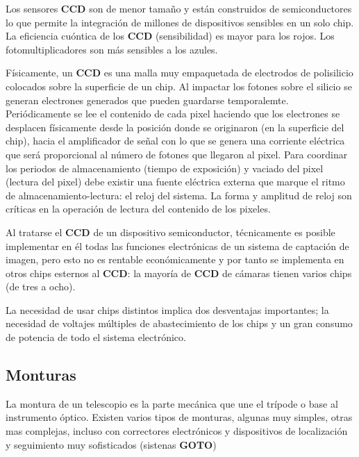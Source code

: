 \bigskip
Los sensores \textbf{CCD} son de menor tamaño y están construidos de semiconductores lo que permite la integración de millones de dispositivos sensibles en un solo chip.
La eficiencia cuóntica de los \textbf{CCD} (sensibilidad) es mayor para los rojos. Los fotomultiplicadores son más sensibles a los azules.

\bigskip
Físicamente, un \textbf{CCD} es una malla muy empaquetada de electrodos de polisilicio colocados sobre la superficie de un chip. Al impactar los fotones sobre el silicio se generan electrones generados que pueden guardarse temporalemte. Periódicamente se lee el contenido de cada pixel haciendo que los electrones se desplacen físicamente desde la posición donde se originaron (en la superficie del chip), hacia el amplificador de señal con lo que se genera una corriente eléctrica que será proporcional al número de fotones que llegaron al pixel. Para coordinar los periodos de almacenamiento (tiempo de exposición) y vaciado del pixel (lectura del pixel) debe existir una fuente eléctrica externa que marque el ritmo de almacenamiento-lectura: el reloj del sistema. La forma y amplitud de reloj son críticas en la operación de lectura del contenido de los pixeles.

\bigskip
Al tratarse el \textbf{CCD} de un dispositivo semiconductor, técnicamente es posible implementar en él todas las funciones electrónicas de un sistema de captación de imagen, pero esto no es rentable económicamente y por tanto se implementa en otros chips esternos al \textbf{CCD}: la mayoría de \textbf{CCD} de cámaras tienen varios chips (de tres a ocho).

\bigskip
La necesidad de usar chips distintos implica dos desventajas importantes; la necesidad de voltajes múltiples de abastecimiento de los chips y un gran consumo de potencia de todo el sistema electrónico.

\subsection{Monturas}

La montura de un telescopio es la parte mecánica que une el trípode o base al instrumento óptico. Existen varios tipos de monturas, algunas muy simples, otras mas complejas, incluso con correctores electrónicos y dispositivos de localización y seguimiento muy sofisticados (sistenas \textbf{GOTO})


